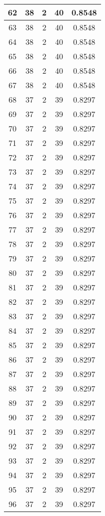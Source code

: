 \documentclass[letterpaper, 12pt]{article}
\begin{document}
\begin{longtable}{|c|c|c|c|c|}
\hline
62 & 38 & 2 & 40 & 0.8548 \\
\hline
63 & 38 & 2 & 40 & 0.8548 \\
\hline
64 & 38 & 2 & 40 & 0.8548 \\
\hline
65 & 38 & 2 & 40 & 0.8548 \\
\hline
66 & 38 & 2 & 40 & 0.8548 \\
\hline
67 & 38 & 2 & 40 & 0.8548 \\
\hline
68 & 37 & 2 & 39 & 0.8297 \\
\hline
69 & 37 & 2 & 39 & 0.8297 \\
\hline
70 & 37 & 2 & 39 & 0.8297 \\
\hline
71 & 37 & 2 & 39 & 0.8297 \\
\hline
72 & 37 & 2 & 39 & 0.8297 \\
\hline
73 & 37 & 2 & 39 & 0.8297 \\
\hline
74 & 37 & 2 & 39 & 0.8297 \\
\hline
75 & 37 & 2 & 39 & 0.8297 \\
\hline
76 & 37 & 2 & 39 & 0.8297 \\
\hline
77 & 37 & 2 & 39 & 0.8297 \\
\hline
78 & 37 & 2 & 39 & 0.8297 \\
\hline
79 & 37 & 2 & 39 & 0.8297 \\
\hline
80 & 37 & 2 & 39 & 0.8297 \\
\hline
81 & 37 & 2 & 39 & 0.8297 \\
\hline
82 & 37 & 2 & 39 & 0.8297 \\
\hline
83 & 37 & 2 & 39 & 0.8297 \\
\hline
84 & 37 & 2 & 39 & 0.8297 \\
\hline
85 & 37 & 2 & 39 & 0.8297 \\
\hline
86 & 37 & 2 & 39 & 0.8297 \\
\hline
87 & 37 & 2 & 39 & 0.8297 \\
\hline
88 & 37 & 2 & 39 & 0.8297 \\
\hline
89 & 37 & 2 & 39 & 0.8297 \\
\hline
90 & 37 & 2 & 39 & 0.8297 \\
\hline
91 & 37 & 2 & 39 & 0.8297 \\
\hline
92 & 37 & 2 & 39 & 0.8297 \\
\hline
93 & 37 & 2 & 39 & 0.8297 \\
\hline
94 & 37 & 2 & 39 & 0.8297 \\
\hline
95 & 37 & 2 & 39 & 0.8297 \\
\hline
96 & 37 & 2 & 39 & 0.8297 \\

\end{longtable}
\end{document}
